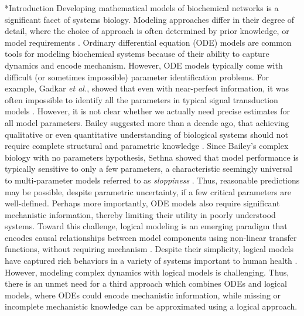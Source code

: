 \documentclass[12pt]{article}
\makeatletter
\renewcommand\section{\@startsection
	{subsection}{2}{0mm}
	{-0.2in}
	{0.05\baselineskip}
	{\normalfont\large\bfseries}}
\makeatother
\begin{document}
\section*{Introduction}
Developing mathematical models of biochemical networks is a significant facet of systems biology.
Modeling approaches differ in their degree of detail, where the choice of approach is often determined by prior knowledge, or model requirements \citep{2012_kholodenko_kolch_SciSig}. 
Ordinary differential equation (ODE) models are common tools for modeling biochemical systems because of their ability to capture dynamics and encode mechanism.
However, ODE models typically come with difficult (or sometimes impossible) parameter identification problems. 
For example, Gadkar \textit{et al.}, showed that even with near-perfect information, 
it was often impossible to identify all the parameters in typical signal transduction models \citep{Gadkar:2005ad}. 
However, it is not clear whether we actually need precise estimates for all model parameters. 
Bailey suggested more than a decade ago, that achieving qualitative or even quantitative understanding of biological systems 
should not require complete structural and parametric knowledge \citep{2001_bailey_NatBiotech}. 
Since Bailey's complex biology with no parameters hypothesis, Sethna showed that model performance is typically 
sensitive to only a few parameters, a characteristic seemingly universal to multi-parameter models referred to as \textit{sloppiness} \citep{Machta:2013aa}.
Thus, reasonable predictions may be possible, despite parametric uncertainty, if a few critical parameters are well-defined. 
Perhaps more importantly, ODE models also require significant mechanistic information, thereby limiting their utility in poorly understood systems.
Toward this challenge, logical modeling is an emerging paradigm that encodes causal relationships between model components using non-linear transfer functions, 
without requiring mechanism \citep{Morris:2010aa}. 
Despite their simplicity, logical models have captured rich behaviors in a variety of systems important to human health \citep{Saez-Rodriguez:2011aa,Morris:2011ys,Morris:2012aa}. 
However, modeling complex dynamics with logical models is challenging. 
Thus, there is an unmet need for a third approach which combines ODEs and logical models, where ODEs could encode mechanistic information, 
while missing or incomplete mechanistic knowledge can be approximated using a logical approach.  
\end{document}

